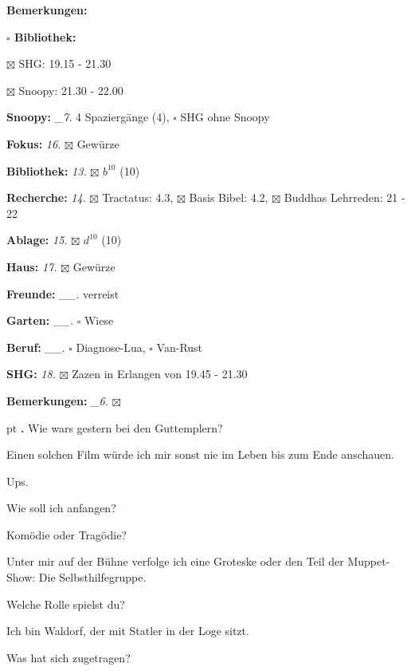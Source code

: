 \documentclass[10pt,a4paper]{article}
\newcounter{notec}
\newcommand\notep[1]{%
  \stepcounter{notec}
  \vskip #1pt
  {\bf\arabic{notec}.}
}
\newcommand\prop[1] {{\color {alizarin} {\bf #1}}}             %
\newcommand\mand[1] {{\color {burntorange} {\bf #1}}}          %
\newcommand\bottomspace{\vskip 4pt}
\newcommand\n[1] { {\sl #1.} \hskip 5pt }
\begin{document}
\begin{mdframed}[style=daystyle]
\begin{labeling}{{\mand {Bemerkungen:}}}
\begin{minipage}{0.75\textwidth}
\begin{labeling}{\prop {$\square$ {Bibliothek:}}}
      \item[$\boxtimes$ SHG:]        19.15 - 21.30
      \item[$\boxtimes$ Snoopy:]     21.30 - 22.00
      \end{labeling}
    \end{minipage}
    \bottomspace
  \item[{\mand {Snoopy:}}]        \n{\_7} 4 Spaziergänge (4), $\square$ SHG ohne Snoopy
  \item[{\mand {Fokus:}}]          \n{16} $\boxtimes$ Gewürze
  \item[{\mand {Bibliothek:}}]     \n{13} $\boxtimes$ $b^{10}$ (10)
  \item[{\mand {Recherche:}}]      \n{14} $\boxtimes$ Tractatus: 4.3, $\boxtimes$ Basis Bibel: 4.2,
      $\boxtimes$ Buddhas Lehrreden: 21 - 22
  \item[{\mand {Ablage:}}]         \n{15} $\boxtimes$ $d^{10}$ (10)
  \item[{\mand {Haus:}}]           \n{17} $\boxtimes$ Gewürze
  \item[{\mand {Freunde:}}]      \n{\_\_} verreist
  \item[{\mand {Garten:}}]       \n{\_\_} $\square$ Wiese
  \item[{\mand {Beruf:}}]        \n{\_\_} $\square$ Diagnose-Lua, $\square$ Van-Rust
  \item[{\mand {SHG:}}]            \n{18} $\boxtimes$ Zazen in Erlangen von 19.45 - 21.30
  \item[{\mand {Bemerkungen:}}]   \n{\_6} $\boxtimes$
  \end{labeling}
    
  \setcounter{notec}{0}
  
  \notep 0 Wie wars gestern bei den Guttemplern?

  \vskip 2pt
  Einen solchen Film würde ich mir sonst nie im Leben bis zum Ende anschauen.

  \vskip 2pt
  Ups.

  \vskip 2pt
  Wie soll ich anfangen?

  \vskip 2pt
  Komödie oder Tragödie?

  \vskip 2pt
  Unter mir auf der Bühne verfolge ich eine Groteske oder den Teil der
  Muppet-Show: Die Selbsthilfegruppe.

  \vskip 2pt
  Welche Rolle spielst du?

  \vskip 2pt
  Ich bin Waldorf, der mit Statler in der Loge sitzt.

  \vskip 2pt
  Was hat sich zugetragen?


\end{mdframed}
\end{document}
